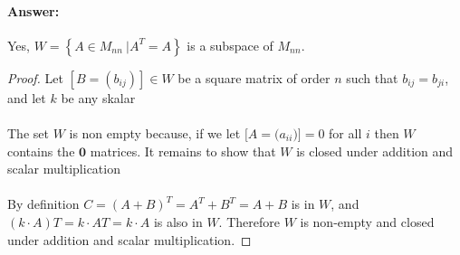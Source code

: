 \documentclass[12pt]{article}
\begin{document}
\begin{enumerate}
\begin{enumerate}
                            \paragraph{Answer:} Yes, $W={ \left\{A \in{M_{nn}} \ |
                                    A^T = A \right\}}$ is a subspace of $M_{nn}$.
                            \begin{proof}
                                    Let $[B = (b_{ij})]\in W$ be a square matrix of order $n$ such that $b_{ij} = b_{ji}$, and let ${k}$ be any skalar\\\\
                                    The set $W$ is non empty because, if we let $[A=({a_{ii})]=0}$ for all $i$ then $W$ contains the $\mathbf{0}$ matrices.
                                    It remains to show that $W$ is closed under addition and scalar multiplication\\\\
                                    By definition $C = (A+B)^T = A^T+B^T = A + B$ is in $W$,
                                    and $(k\cdot A)T = k\cdot AT = k\cdot A$ is also in $W$.
                                    Therefore $W$ is non-empty and closed under addition and scalar multiplication.
                            \end{proof}
              \end{enumerate}
\end{enumerate}
\end{document}
